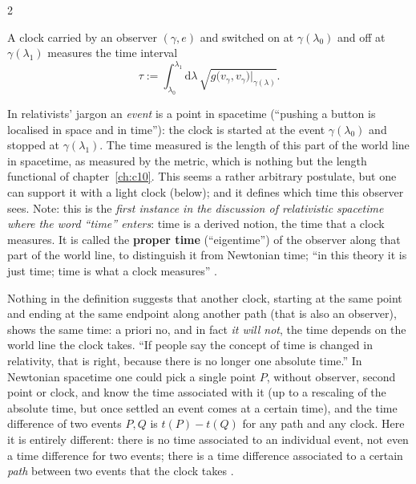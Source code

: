 \begin{paracol}{2}
\begin{definition}\label{def:c13-p3}
A clock carried by an observer $(\gamma,e)$ and switched on at $\gamma(\lambda_0)$ and off at $\gamma(\lambda_1)$ measures the time interval
\[
  \tau:=\int_{\lambda_0}^{\lambda_1}\mathrm d\lambda\,\sqrt{g\bigl(v_\gamma,v_\gamma\bigr)\big|_{\gamma(\lambda)}}.
\]
\end{definition}
In relativists' jargon an \emph{event} is a point in spacetime (``pushing a button is localised in space and in time''): the clock is started at the event $\gamma(\lambda_0)$ and stopped at $\gamma(\lambda_1)$. The time measured is the length of this part of the world line in spacetime, as measured by the metric, which is nothing but the length functional of chapter~\ref{ch:c10}. This seems a rather arbitrary postulate, but one can support it with a light clock (below); and it defines which time this observer sees. Note: this is the \emph{first instance in the discussion of relativistic spacetime where the word ``time'' enters}: time is a derived notion, the time that a clock measures. It is called the \textbf{proper time} (``eigentime'') of the observer along that part of the world line, to distinguish it from Newtonian time; ``in this theory it is just time; time is what a clock measures'' .

Nothing in the definition suggests that another clock, starting at the same point and ending at the same endpoint along another path (that is also an observer), shows the same time: a priori no, and in fact \emph{it will not}, the time depends on the world line the clock takes. ``If people say the concept of time is changed in relativity, that is right, because there is no longer one absolute time.'' In Newtonian spacetime one could pick a single point $P$, without observer, second point or clock, and know the time associated with it (up to a rescaling of the absolute time, but once settled an event comes at a certain time), and the time difference of two events $P,Q$ is $t(P)-t(Q)$ for any path and any clock. Here it is entirely different: there is no time associated to an individual event, not even a time difference for two events; there is a time difference associated to a certain \emph{path} between two events that the clock takes .


\end{paracol}
